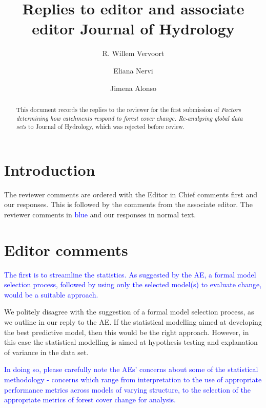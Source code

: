 \documentclass[]{elsarticle} %
\begin{document}
\begin{frontmatter}

  \title{Replies to editor and associate editor Journal of Hydrology}
    \author[]{R. Willem Vervoort}
  
    \author[]{Eliana Nervi}
  
    \author[]{Jimena Alonso}
  
  
  \begin{abstract}
  This document records the replies to the reviewer for the first submission of \emph{Factors determining how catchments respond to forest cover change. Re-analysing global data sets} to Journal of Hydrology, which was rejected before review.
  \end{abstract}
  
 \end{frontmatter}

\hypertarget{introduction}{%
\section{Introduction}\label{introduction}}

The reviewer comments are ordered with the Editor in Chief comments first and our responses. This is followed by the comments from the associate editor. The reviewer comments in \textcolor{blue}{blue} and our responses in normal text.

\hypertarget{editor-comments}{%
\section{Editor comments}\label{editor-comments}}

\textcolor{blue}{The first is to streamline the statistics.  As suggested by the AE, a formal model selection process, followed by using only the selected model(s) to evaluate change, would be a suitable approach.}

We politely disagree with the suggestion of a formal model selection process, as we outline in our reply to the AE. If the statistical modelling aimed at developing the best predictive model, then this would be the right approach. However, in this case the statistical modelling is aimed at hypothesis testing and explanation of variance in the data set.

\textcolor{blue}{In doing so, please carefully note the AEs' concerns about some of the statistical methodology - concerns which range from interpretation to the use of appropriate performance metrics across models of varying structure, to the selection of the appropriate metrics of forest cover change for analysis.}
\end{document}
